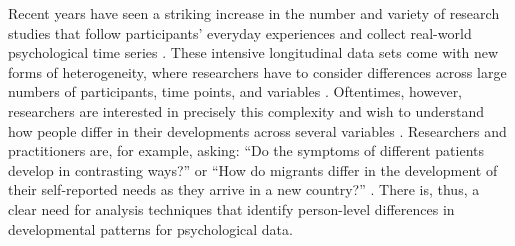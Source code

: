 \documentclass[man, 12pt, a4paper, mask, floatsintext]{apa7}
\theoremstyle{break}
\theoremstyle{plain}
\begin{document}

Recent years have seen a striking increase in the number and variety of research studies that follow participants' everyday experiences and collect real-world psychological time series \citep[e.g.,][]{hamaker2017}. These intensive longitudinal data sets come with new forms of heterogeneity, where researchers have to consider differences across large numbers of participants, time points, and variables \citep[e.g.,][]{cattell1966, wardenaar2013}. Oftentimes, however, researchers are interested in precisely this complexity and wish to understand how people differ in their developments across several variables \citep[e.g.,][]{ernst2021}. Researchers and practitioners are, for example, asking: ``Do the symptoms of different patients develop in contrasting ways?'' \citep{Monden2015} or ``How do migrants differ in the development of their self-reported needs as they arrive in a new country?'' \citep{Kreienkamp2022d}. There is, thus, a clear need for analysis techniques that identify person-level differences in developmental patterns for psychological data.
\end{document}
